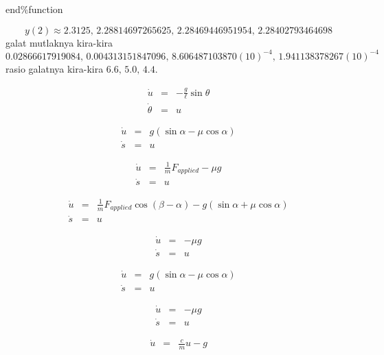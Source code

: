 \begin{description}
\begin{lyxcode}
end\%function~
\end{lyxcode}
\item [{\ref{exc:ode-taylor-12}:}] 
\[
y(2)\approx2.3125,\,2.28814697265625,\,2.28469446951954,\,2.28402793464698
\]
 galat mutlaknya kira-kira 
\[
0.02866617919084,\,0.004313151847096,\,8.606487103870(10)^{-4},\,1.941138378267(10)^{-4}
\]
 rasio galatnya kira-kira $6.6,\,5.0,\,4.4$.
\item [{\ref{exc:ode-taylor-13}a:}] 
\begin{eqnarray*}
\dot{u} & = & -\frac{g}{\ell}\sin\theta\\
\dot{\theta} & = & u
\end{eqnarray*}
\item [{\ref{exc:ode-taylor-13}b:}] 
\begin{eqnarray*}
\dot{u} & = & g(\sin\alpha-\mu\cos\alpha)\\
\dot{s} & = & u
\end{eqnarray*}
\item [{\ref{exc:ode-taylor-13}e:}] 
\begin{eqnarray*}
\dot{u} & = & \frac{1}{m}F_{applied}-\mu g\\
\dot{s} & = & u
\end{eqnarray*}
\item [{\ref{exc:ode-taylor-13}g:}] 
\begin{eqnarray*}
\dot{u} & = & \frac{1}{m}F_{applied}\cos(\beta-\alpha)-g(\sin\alpha+\mu\cos\alpha)\\
\dot{s} & = & u
\end{eqnarray*}
\item [{\ref{exc:ode-taylor-13}h:}] 
\begin{eqnarray*}
\dot{u} & = & -\mu g\\
\dot{s} & = & u
\end{eqnarray*}
\item [{\ref{exc:ode-taylor-13}i:}] 
\begin{eqnarray*}
\dot{u} & = & g(\sin\alpha-\mu\cos\alpha)\\
\dot{s} & = & u
\end{eqnarray*}
\item [{\ref{exc:ode-taylor-13}j:}] 
\begin{eqnarray*}
\dot{u} & = & -\mu g\\
\dot{s} & = & u
\end{eqnarray*}
\item [{\ref{exc:ode-taylor-13}l:}] 
\begin{eqnarray*}
\dot{u} & = & \frac{c}{m}u-g\\

\end{eqnarray*}
\end{description}
